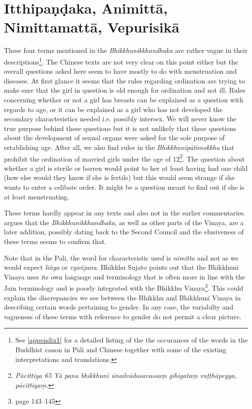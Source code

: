 \section{Itthipaṇḍaka, Animittā, Nimittamattā, Vepurisikā}

These four terms mentioned in the {\em Bhikkhunikkhandhaka} are rather vague in their descriptions\footnote{See \ref{appendix1} for a detailed listing of the the occurances of the words in the Buddhist canon in Pāli and Chinese together with some of the existing interpretations and translations.}. The Chinese texts are not very clear on this point either but the overall questions asked here seem to have mostly to do with menstruation and diseases. At first glance it seems that the rules regarding ordination are trying to make sure that the girl in question is old enough for ordination and not ill. Rules concerning whether or not a girl has breasts can be explained as a question with regards to age, or it can be explained as a girl who has not developed the secondary characteristics needed i.e. possibly intersex. We will never know the true purpose behind these questions but it is not unlikely that these questions about the development of sexual organs were asked for the sole purpose of establishing age. After all, we also find rules in the {\em Bhikkhunīpātimokkha} that prohibit the ordination of married girls under the age of 12\footnote{{\em Pācittiya 65 Yā pana bhikkhunī ūnad­vāda­sa­vassaṃ gihigataṃ vuṭṭhāpeyya, pācittiyaṃ.}}. The question about whether a girl is sterile or barren would point to her at least having had one child (how else would they know if she is fertile) but this would seem strange if she wants to enter a celibate order. It might be a question meant to find out if she is at least menstruating. 

These terms hardly appear in any texts and also not in the earlier commentaries. \cite{sujato2009} argues that the {\em Bhikkhunikkhandhaka}, as well as other parts of the Vinaya, are a later addition, possibly dating back to the Second Council and the elusiveness of these terms seems to confirm that.

Note that in the Pali, the word for characteristic used is {\em nimitta} and not as we would expect {\em liṅga} or {\em vyañ­jana}. Bhikkhu Sujato points out that the Bhikkhunī Vinaya uses its own language and terminology that is often more in line with the Jain terminology and is poorly integrated with the Bhikkhu Vinaya\footnote{\cite{sujato2009} page 143–145}. This could explain the discrepancies we see between the Bhikkhu and Bhikkhunī Vinaya in describing certain words pertaining to gender. In any case, the variabilty and vagueness of these terms with reference to gender do not permit a clear picture. 

